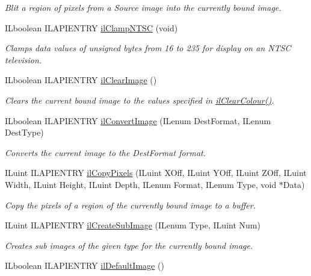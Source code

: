 \begin{DoxyCompactItemize}
\begin{DoxyCompactList}\small\item\em Blit a region of pixels from a {\itshape Source} image into the currently bound image. \end{DoxyCompactList}\item 
I\-Lboolean I\-L\-A\-P\-I\-E\-N\-T\-R\-Y \hyperlink{group__image__manip_gab2c623d693bf0f5c2f046a64af7b22ba}{il\-Clamp\-N\-T\-S\-C} (void)
\begin{DoxyCompactList}\small\item\em Clamps data values of unsigned bytes from 16 to 235 for display on an N\-T\-S\-C television. \end{DoxyCompactList}\item 
\hypertarget{group__image__manip_gae48d76d54f6f00fe54b304c29224653f}{I\-Lboolean I\-L\-A\-P\-I\-E\-N\-T\-R\-Y \hyperlink{group__image__manip_gae48d76d54f6f00fe54b304c29224653f}{il\-Clear\-Image} ()}\label{group__image__manip_gae48d76d54f6f00fe54b304c29224653f}

\begin{DoxyCompactList}\small\item\em Clears the current bound image to the values specified in \hyperlink{group__state_gaca1dc7f7b8e61eb134060c9c8a8b72f2}{il\-Clear\-Colour()}. \end{DoxyCompactList}\item 
I\-Lboolean I\-L\-A\-P\-I\-E\-N\-T\-R\-Y \hyperlink{group__image__manip_ga82b125402ed12ed399f181165374a7c1}{il\-Convert\-Image} (I\-Lenum Dest\-Format, I\-Lenum Dest\-Type)
\begin{DoxyCompactList}\small\item\em Converts the current image to the Dest\-Format format. \end{DoxyCompactList}\item 
I\-Luint I\-L\-A\-P\-I\-E\-N\-T\-R\-Y \hyperlink{group__image__manip_gaa1410977695d1633907ff371e5b9c77e}{il\-Copy\-Pixels} (I\-Luint X\-Off, I\-Luint Y\-Off, I\-Luint Z\-Off, I\-Luint Width, I\-Luint Height, I\-Luint Depth, I\-Lenum Format, I\-Lenum Type, void $\ast$Data)
\begin{DoxyCompactList}\small\item\em Copy the pixels of a region of the currently bound image to a buffer. \end{DoxyCompactList}\item 
I\-Luint I\-L\-A\-P\-I\-E\-N\-T\-R\-Y \hyperlink{group__image__manip_gabc158c1aed9358ad456527f7cdb03446}{il\-Create\-Sub\-Image} (I\-Lenum Type, I\-Luint Num)
\begin{DoxyCompactList}\small\item\em Creates sub images of the given type for the currently bound image. \end{DoxyCompactList}\item 
\hypertarget{group__image__manip_ga3084506414c867df1f37234d996e2501}{I\-Lboolean I\-L\-A\-P\-I\-E\-N\-T\-R\-Y \hyperlink{group__image__manip_ga3084506414c867df1f37234d996e2501}{il\-Default\-Image} ()}\label{group__image__manip_ga3084506414c867df1f37234d996e2501}


\end{DoxyCompactItemize}
